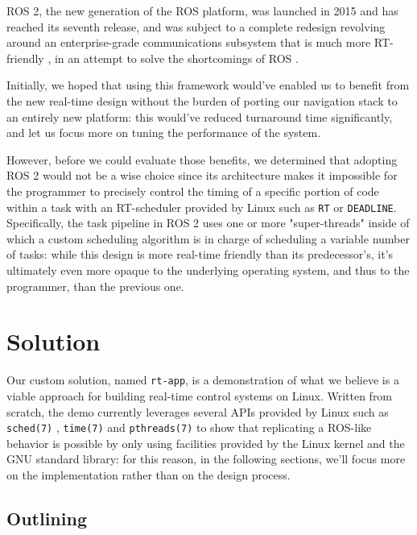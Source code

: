 \documentclass[a4paper,12pt]{report}
\begin{document}
ROS 2, the new generation of the ROS platform, was launched in 2015 and has reached its seventh release, and was subject to a complete redesign revolving around an enterprise-grade communications subsystem that is much more RT-friendly \cite{dds-design-performance}, in an attempt to solve the shortcomings of ROS \cite{ros2-realtime-intro}. 

Initially, we hoped that using this framework would've enabled us to benefit from the new real-time design without the burden of porting our navigation stack to an entirely new platform: this would've reduced turnaround time significantly, and let us focus more on tuning the performance of the system.

However, before we could evaluate those benefits, we determined that adopting ROS 2 would not be a wise choice since its architecture makes it impossible for the programmer to precisely control the timing of a specific portion of code within a task with an RT-scheduler provided by Linux such as \texttt{RT} or \texttt{DEADLINE}. Specifically, the task pipeline in ROS 2 uses one or more "super-threads" inside of which a custom scheduling algorithm is in charge of scheduling a variable number of tasks\cite{ros2-rt-analysis}: while this design is more real-time friendly than its predecessor's, it's ultimately even more opaque to the underlying operating system, and thus to the programmer, than the previous one.

\newpage
\chapter{Solution}

Our custom solution, named \texttt{rt-app}, is a demonstration of what we believe is a viable approach for building real-time control systems on Linux. Written from scratch, the demo currently leverages several APIs provided by Linux such as \texttt{sched(7)} \cite{man-sched-7}, \texttt{time(7)} \cite{man-time-7} and \texttt{pthreads(7)} \cite{man-pthreads-7} to show that replicating a ROS-like behavior is possible by only using facilities provided by the Linux kernel and the GNU standard library: for this reason, in the following sections, we'll focus more on the implementation rather than on the design process.

\section{Outlining}
\end{document}
